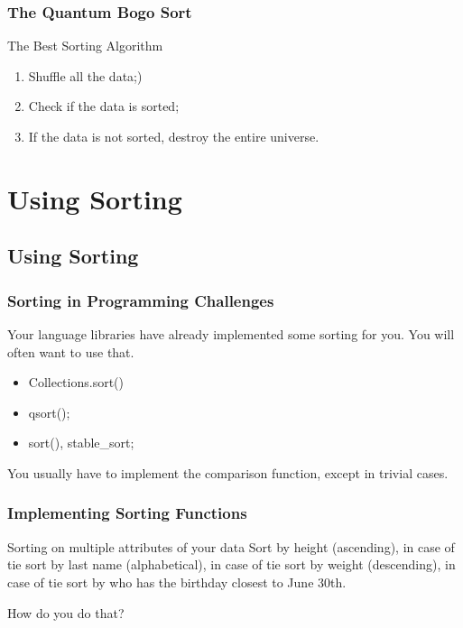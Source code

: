 \documentclass{beamer}
\begin{document}
\begin{frame}
  \frametitle{The \alert{Quantum} Bogo Sort}
  
  \begin{block}{The \alert{Best} Sorting Algorithm}
    \begin{enumerate}
    \item Shuffle all the data;)
    \item Check if the data is sorted;
    \item If the data is not sorted, destroy the entire universe.      
    \end{enumerate}
  \end{block}
\end{frame}

\section{Using Sorting}

\subsection{Using Sorting}

\begin{frame}
  \frametitle{Sorting in Programming Challenges}
  \begin{block}{}
    Your language libraries have already implemented some sorting for
    you. You will often want to use that.
  \end{block}
  \medskip
  \begin{itemize}
    \item {} Collections.sort()
    \item {} qsort();
    \item {} sort(), stable\_sort; 
  \end{itemize}
  \medskip
  You usually have to implement the comparison function, except in
  trivial cases.
\end{frame}

\begin{frame}
  \frametitle{Implementing Sorting Functions}
  \begin{block}{Sorting on multiple attributes of your data}
    Sort by height (ascending), in case of tie sort by last name
    (alphabetical), in case of tie sort by weight (descending), in
    case of tie sort by who has the birthday closest to June 30th.
  \end{block}
  \begin{center}
    How do you do that?
  \end{center}
\end{frame}
\end{document}
